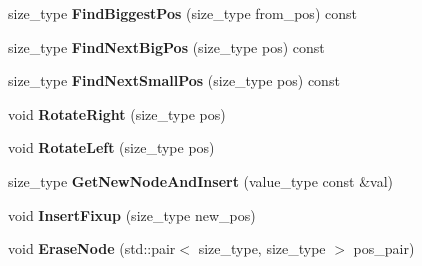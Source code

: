 \begin{DoxyCompactItemize}
\item 
\hypertarget{classlsf_1_1container_1_1detail_1_1RBTreeState_a4576793e64b2a8c20f80efd4f9ecba68}{
size\_\-type {\bfseries FindBiggestPos} (size\_\-type from\_\-pos) const }
\label{classlsf_1_1container_1_1detail_1_1RBTreeState_a4576793e64b2a8c20f80efd4f9ecba68}

\item 
\hypertarget{classlsf_1_1container_1_1detail_1_1RBTreeState_ac835ea5df05ac36a4c1311908bd05593}{
size\_\-type {\bfseries FindNextBigPos} (size\_\-type pos) const }
\label{classlsf_1_1container_1_1detail_1_1RBTreeState_ac835ea5df05ac36a4c1311908bd05593}

\item 
\hypertarget{classlsf_1_1container_1_1detail_1_1RBTreeState_a3a958ed8aa1338a3dae766060b19e161}{
size\_\-type {\bfseries FindNextSmallPos} (size\_\-type pos) const }
\label{classlsf_1_1container_1_1detail_1_1RBTreeState_a3a958ed8aa1338a3dae766060b19e161}

\item 
\hypertarget{classlsf_1_1container_1_1detail_1_1RBTreeState_a0f2a4867a83bc3ed4b1e84c79b7f9535}{
void {\bfseries RotateRight} (size\_\-type pos)}
\label{classlsf_1_1container_1_1detail_1_1RBTreeState_a0f2a4867a83bc3ed4b1e84c79b7f9535}

\item 
\hypertarget{classlsf_1_1container_1_1detail_1_1RBTreeState_a770cacd4871335f9eae223b896f4c8da}{
void {\bfseries RotateLeft} (size\_\-type pos)}
\label{classlsf_1_1container_1_1detail_1_1RBTreeState_a770cacd4871335f9eae223b896f4c8da}

\item 
\hypertarget{classlsf_1_1container_1_1detail_1_1RBTreeState_a872cb1fa7fcf7f11077e1f4afa492c31}{
size\_\-type {\bfseries GetNewNodeAndInsert} (value\_\-type const \&val)}
\label{classlsf_1_1container_1_1detail_1_1RBTreeState_a872cb1fa7fcf7f11077e1f4afa492c31}

\item 
\hypertarget{classlsf_1_1container_1_1detail_1_1RBTreeState_a22490c20f3ce5579f5ff6d5133f56cff}{
void {\bfseries InsertFixup} (size\_\-type new\_\-pos)}
\label{classlsf_1_1container_1_1detail_1_1RBTreeState_a22490c20f3ce5579f5ff6d5133f56cff}

\item 
\hypertarget{classlsf_1_1container_1_1detail_1_1RBTreeState_aec5e3b6f8480fe4408cfb17fe76f4365}{
void {\bfseries EraseNode} (std::pair$<$ size\_\-type, size\_\-type $>$ pos\_\-pair)}
\label{classlsf_1_1container_1_1detail_1_1RBTreeState_aec5e3b6f8480fe4408cfb17fe76f4365}


\end{DoxyCompactItemize}

